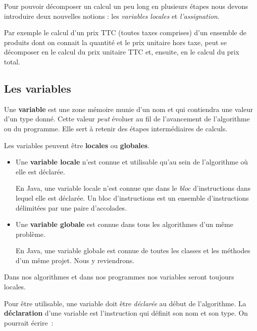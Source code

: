 		Pour pouvoir décomposer un calcul un peu long en plusieurs étapes
		nous devons introduire deux nouvelles notions :
		les \emph{variables locales} et \emph{l’assignation}.

		Par exemple le calcul d'un prix TTC (toutes taxes comprises) d'un
		ensemble de produits dont on connait la quantité et le prix unitaire
		hors taxe, peut se décomposer en le calcul du prix unitaire TTC et,
		ensuite, en le calcul du prix total. 

		\subsection{Les variables}
		
			Une \textbf{variable} est une zone mémoire munie
			d'un nom et qui contiendra une valeur d’un type donné.  Cette valeur
			\emph{peut} évoluer au fil de l'avancement de l'algorithme ou du
			programme.  Elle sert à retenir des étapes intermédiaires de
			calculs.

			Les variables peuvent être \textbf{locales} ou \textbf{globales}.

			\begin{itemize}
				
				\item Une \textbf{variable locale} n'est
					connue et utilisable qu'au sein de l'algorithme où elle est
					déclarée. 

					En Java, une variable locale n'est connue que dans le
					\emph{bloc} d'instructions dans lequel elle est déclarée.
					Un bloc d'instructions  est un ensemble
					d'instructions délimitées par une paire d'accolades. 

				\item Une \textbf{variable globale} est 
					connue dans tous les algorithmes d'un même problème. 

					En Java, une variable globale est connue de toutes les
					classes et les méthodes d'un même projet. Nous y reviendrons. 

			\end{itemize}
				
			Dans nos algorithmes et dans nos programmes nos variables  seront
			toujours locales. 

			Pour être utilisable, une variable doit être \emph{déclarée} au
			début de l’algorithme. La \textbf{déclaration}
			d’une variable est l’instruction qui définit son nom et son type.
			On pourrait écrire~:

